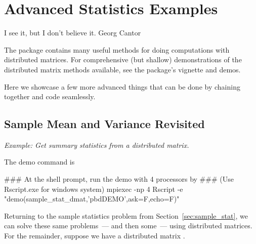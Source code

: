 
\chapter{Advanced Statistics Examples}
\label{chpt:avdstat}

\inspire%
{I see it, but I don't believe it.}%
{Georg Cantor}
\vspace{0.5cm}


The  package contains many useful methods for doing computations
with distributed matrices. For comprehensive (but shallow) demonstrations of
the distributed matrix methods available, see the  package's
vignette and demos.

Here we showcase a few more advanced things that can be done by chaining
together  and \pbdR code seamlessly.





\section{Sample Mean and Variance Revisited}

\emph{Example:  Get summary statistics from a distributed matrix.}

The demo command is
\begin{Command}
### At the shell prompt, run the demo with 4 processors by
### (Use Rscript.exe for windows system)
mpiexec -np 4 Rscript -e "demo(sample_stat_dmat,'pbdDEMO',ask=F,echo=F)"
\end{Command}

Returning to the sample statistics problem from
Section~\ref{sec:sample_stat}, we can solve these same problems~--- and
then some~--- using distributed matrices. For the remainder, suppose we
have a distributed matrix .

